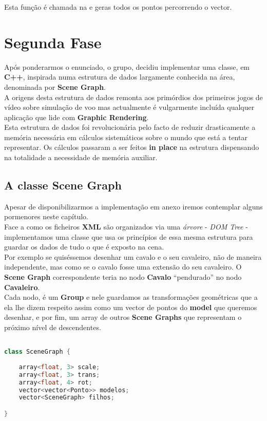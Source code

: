 \documentclass{article}
\begin{document}
Esta função é chamada na  e geras todos os pontos percorrendo o vector.

\newpage

\section{Segunda Fase}
Após ponderarmos o enunciado, o grupo, decidiu implementar uma classe, em \textbf{C++}, inspirada numa estrutura de dados largamente conhecida na área, denominada por \textbf{Scene Graph}.\\
A origens desta estrutura de dados remonta aos primórdios dos primeiros jogos de vídeo sobre simulação de voo mas actualmente é vulgarmente incluída qualquer aplicação que lide com \textbf{Graphic Rendering}.\\
Esta estrutura de dados foi revolucionária pelo facto de reduzir drasticamente a memória necessária em cálculos sistemáticos sobre o mundo que está a tentar representar. Os cálculos passaram a ser feitos \textbf{in place} na estrutura dispensando na totalidade a necessidade de memória auxiliar. 

\subsection{A classe Scene Graph}
Apesar de disponibilizarmos a implementação em anexo iremos contemplar alguns pormenores neste capítulo.\\
Face a como os ficheiros \textbf{XML} são organizados via uma \textit{árvore} - \textit{DOM Tree} - implementamos uma classe que usa os princípios de essa mesma estrutura para guardar os dados de tudo o que é exposto na cena.\\
Por exemplo se quiséssemos desenhar um cavalo e o seu cavaleiro, não de maneira independente, mas como se o cavalo fosse uma extensão do seu cavaleiro. O \textbf{Scene Graph} correspondente teria no nodo \textbf{Cavalo} “pendurado” no nodo \textbf{Cavaleiro}.\\
Cada nodo, é um \textbf{Group} e nele guardamos as transformações geométricas que a ela lhe dizem respeito assim como um vector de pontos do \textbf{model} que queremos desenhar, e por fim, um array de outros \textbf{Scene Graphs} que representam o próximo nível de descendentes.\\

\begin{file}
    \begin{lstlisting}[language=C++]

class SceneGraph {
    
    array<float, 3> scale;
    array<float, 3> trans;
    array<float, 4> rot;
    vector<vector<Ponto>> modelos;
    vector<SceneGraph> filhos;

}

    \end{lstlisting}
\end{file}
\end{document}
